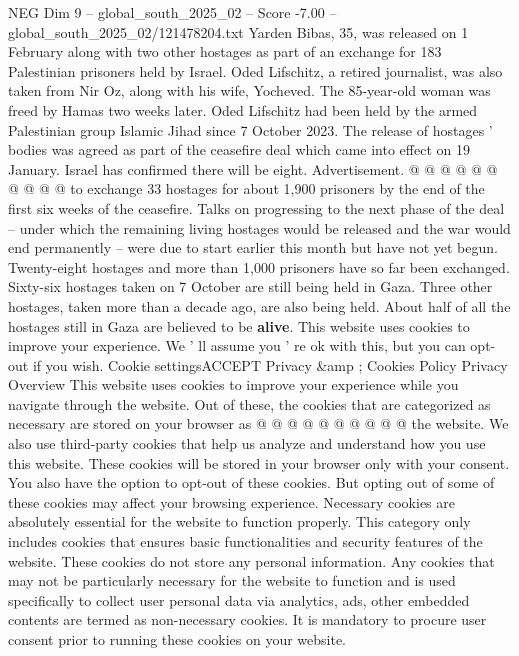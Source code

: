 \begin{textsample}{NEG Dim 9 – global\_south\_2025\_02 – Score -7.00 – global\_south\_2025\_02/121478204.txt}
Yarden Bibas, 35, was released on 1 February along with two other hostages as part of an exchange for 183 Palestinian prisoners held by Israel.
Oded Lifschitz, a retired journalist, was also taken from Nir Oz, along with his wife, Yocheved.
The 85-year-old woman was freed by Hamas two weeks later.
Oded Lifschitz had been held by the armed Palestinian group Islamic Jihad since 7 October 2023.
The release of hostages ' bodies was agreed as part of the ceasefire deal which came into effect on 19 January.
Israel has confirmed there will be eight.
Advertisement. @ @ @ @ @ @ @ @ @ @ to exchange 33 hostages for about 1,900 prisoners by the end of the first six weeks of the ceasefire.
Talks on progressing to the next phase of the deal -- under which the remaining living hostages would be released and the war would end permanently -- were due to start earlier this month but have not yet begun.
Twenty-eight hostages and more than 1,000 prisoners have so far been exchanged.
Sixty-six hostages taken on 7 October are still being held in Gaza.
Three other hostages, taken more than a decade ago, are also being held.
About half of all the hostages still in Gaza are believed to be \textbf{alive}.
This website uses cookies to improve your experience.
We ' ll assume you ' re ok with this, but you can opt-out if you wish.
Cookie settingsACCEPT Privacy \&amp ; Cookies Policy Privacy Overview This website uses cookies to improve your experience while you navigate through the website.
Out of these, the cookies that are categorized as necessary are stored on your browser as @ @ @ @ @ @ @ @ @ @ the website.
We also use third-party cookies that help us analyze and understand how you use this website.
These cookies will be stored in your browser only with your consent.
You also have the option to opt-out of these cookies.
But opting out of some of these cookies may affect your browsing experience.
Necessary cookies are absolutely essential for the website to function properly.
This category only includes cookies that ensures basic functionalities and security features of the website.
These cookies do not store any personal information.
Any cookies that may not be particularly necessary for the website to function and is used specifically to collect user personal data via analytics, ads, other embedded contents are termed as non-necessary cookies.
It is mandatory to procure user consent prior to running these cookies on your website.

\end{textsample}
